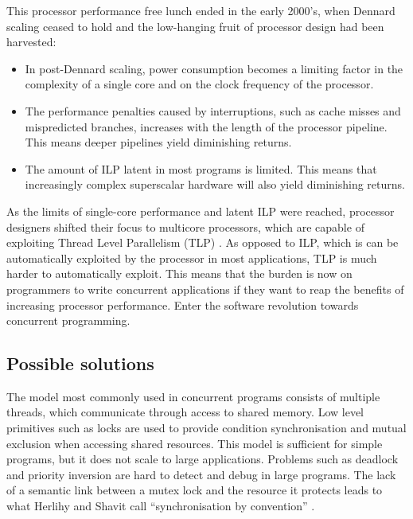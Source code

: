 \documentclass[12pt,a4paper,twoside,openright]{report}
\begin{document}
This processor performance free lunch \cite{FreeLunchIsOver} ended in
the early 2000's, when Dennard scaling ceased to hold and the
low-hanging fruit of processor design had been harvested:

\begin{itemize}
\item In post-Dennard scaling, power consumption becomes a limiting
  factor in the complexity of a single core and on the clock frequency
  of the processor.
  
\item The performance penalties caused by interruptions, such as cache
  misses and mispredicted branches, increases with the length of the
  processor pipeline. This means deeper pipelines yield diminishing
  returns.
  
\item The amount of ILP latent in most programs is limited. This means
  that increasingly complex superscalar hardware will also yield
  diminishing returns.
\end{itemize}

As the limits of single-core performance and latent ILP were reached,
processor designers shifted their focus to multicore processors, which
are capable of exploiting Thread Level Parallelism (TLP)
\cite[Chapter~5]{CompArchBook}. As opposed to ILP, which is can be
automatically exploited by the processor in most applications, TLP is
much harder to automatically exploit. This means that the burden is
now on programmers to write concurrent applications if they want to
reap the benefits of increasing processor performance. Enter the
software revolution towards concurrent programming.

\subsection{Possible solutions}
\label{sec:possible-solutions}

The model most commonly used in concurrent programs consists of
multiple threads, which communicate through access to shared
memory. Low level primitives such as locks are used to provide
condition synchronisation and mutual exclusion when accessing shared
resources. This model is sufficient for simple programs, but it does
not scale to large applications. Problems such as deadlock and
priority inversion are hard to detect and debug in large programs. The
lack of a semantic link between a mutex lock and the resource it
protects leads to what Herlihy and Shavit call ``synchronisation by
convention'' \cite[Chapter 18]{ArtMultiprocessorProgramming}.
\end{document}
